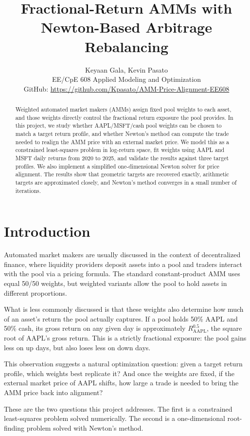 \documentclass[12pt]{article}
\title{Fractional-Return AMMs with Newton-Based Arbitrage Rebalancing}
\author{Keyaan Gala, Kevin Pasato\\
\small EE/CpE 608 Applied Modeling and Optimization\\
\small GitHub: \url{https://github.com/Kpasato/AMM-Price-Alignment-EE608}}
\date{}
\begin{document}
\maketitle

\begin{abstract}
Weighted automated market makers (AMMs) assign fixed pool weights to each asset, and those weights directly control the fractional return exposure the pool provides. In this project, we study whether AAPL/MSFT/cash pool weights can be chosen to match a target return profile, and whether Newton's method can compute the trade needed to realign the AMM price with an external market price. We model this as a constrained least-squares problem in log-return space, fit weights using AAPL and MSFT daily returns from 2020 to 2025, and validate the results against three target profiles. We also implement a simplified one-dimensional Newton solver for price alignment. The results show that geometric targets are recovered exactly, arithmetic targets are approximated closely, and Newton's method converges in a small number of iterations.
\end{abstract}

\section{Introduction}

Automated market makers are usually discussed in the context of decentralized finance, where liquidity providers deposit assets into a pool and traders interact with the pool via a pricing formula. The standard constant-product AMM uses equal 50/50 weights, but weighted variants allow the pool to hold assets in different proportions.

What is less commonly discussed is that these weights also determine how much of an asset's return the pool actually captures. If a pool holds 50\% AAPL and 50\% cash, its gross return on any given day is approximately $R_{\text{AAPL}}^{0.5}$, the square root of AAPL's gross return. This is a strictly fractional exposure: the pool gains less on up days, but also loses less on down days.

This observation suggests a natural optimization question: given a target return profile, which weights best replicate it? And once the weights are fixed, if the external market price of AAPL shifts, how large a trade is needed to bring the AMM price back into alignment?

These are the two questions this project addresses. The first is a constrained least-squares problem solved numerically. The second is a one-dimensional root-finding problem solved with Newton's method.
\end{document}
